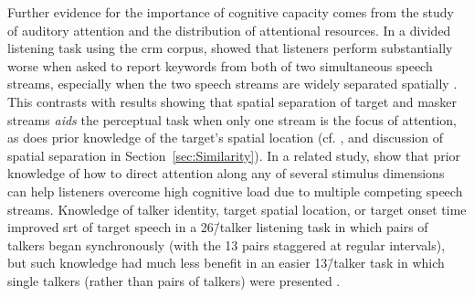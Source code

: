 Further evidence for the importance of cognitive capacity comes from the study of auditory attention and the distribution of attentional resources.  In a divided listening task using the \ac{crm} corpus, \citeauthor*{BestEtAl2006} showed that listeners perform substantially worse when asked to report keywords from both of two simultaneous speech streams, especially when the two speech streams are widely separated spatially \citep{BestEtAl2006}.  This contrasts with results showing that spatial separation of target and masker streams {\em aids} the perceptual task when only one stream is the focus of attention, as does prior knowledge of the target’s spatial location (cf. \citealt{KiddEtAl2005a}, and discussion of spatial separation in Section~\ref{sec:Similarity}).  In a related study, \citeauthor*{KitterickEtAl2010} show that prior knowledge of how to direct attention along any of several stimulus dimensions can help listeners overcome high cognitive load due to multiple competing speech streams.  Knowledge of talker identity, target spatial location, or target onset time improved \ac{srt} of target speech in a 26\=/talker listening task in which pairs of talkers began synchronously (with the 13 pairs staggered at regular intervals), but such knowledge had much less benefit in an easier 13\=/talker task in which single talkers (rather than pairs of talkers) were presented \citep{KitterickEtAl2010}.  %



